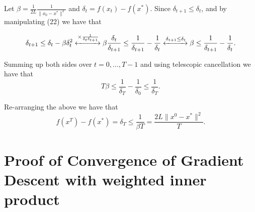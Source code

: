 \documentclass{article}
\begin{document}
Let \( \beta = \frac{1}{2L} \frac{1}{\|x_0 - x^*\|^2} \)  \quad  and \( \delta_t = f(x_t) - f(x^*) \). Since \( \delta_{t+1} \leq \delta_t \), and by manipulating (22) we have that

\[
\delta_{t+1} \leq \delta_t - \beta \delta_t^2 \xleftrightarrow{\times \frac{1}{\delta_t \delta_{t+1}}}
\beta \frac{\delta_t}{\delta_{t+1}} \leq \frac{1}{\delta_{t+1}} - \frac{1}{\delta_t}
\xleftrightarrow{\delta_{t+1} \leq \delta_t}
\beta \leq \frac{1}{\delta_{t+1}} - \frac{1}{\delta_t}.
\]

Summing up both sides over $t = 0, \dots, T - 1$ and using telescopic cancellation we have that
\[
T \beta \leq \frac{1}{\delta_T} - \frac{1}{\delta_0} \leq \frac{1}{\delta_T}.
\]

Re-arranging the above we have that
\[
f(x^T) - f(x^*) = \delta_T \leq \frac{1}{\beta T} = \frac{2L \|x^0 - x^*\|^2}{T}.
\]

\section*{Proof of Convergence of Gradient Descent with weighted inner product}





\end{document}
